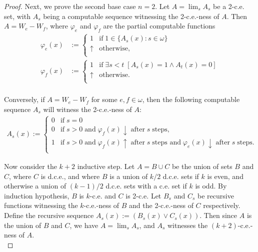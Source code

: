 \documentclass{article}
\begin{document}
\begin{enumerate}[label={\bf Q\arabic*:}]
\begin{proof}
      Next, we prove the second base case $n=2$. Let $A=\lim_s A_s$ be a
      2-c.e. set, with $A_s$ being a computable sequence witnessing the
      2-c.e.-ness of $A$. Then $A=W_e-W_f$, where $\varphi_e$ and
      $\varphi_f$ are the partial computable functions
      \begin{align*}
        \varphi_e(x) &:=
        \begin{cases}
          1 &\text{if}\; 1\in\{A_s(x):s\in\omega\}\\
          \uparrow &\text{otherwise},\\
        \end{cases}\\
        \varphi_f(x) &:=
        \begin{cases}
          1 &\text{if}\; \exists s<t\; \left[A_s(x)=1\wedge
            A_t(x)=0\right]\\
          \uparrow &\text{otherwise}.\\
        \end{cases}\\
      \end{align*}

      Conversely, if $A=W_e-W_f$ for some $e,f\in\omega$, then the
      following computable sequence $A_s$ will witness the 2-c.e.-ness of
      $A$:
      \begin{align*}
        A_s(x) :=
        \begin{cases}
          0 &\text{if}\; s=0\\
          0 &\text{if}\; s>0\; \text{and}\; \varphi_f(x)\downarrow\;
            \text{after}\; s\; \text{steps},\\
          1 &\text{if}\; s>0\; \text{and}\; \varphi_f(x)\uparrow\;
            \text{after}\; s\; \text{steps and}\; \varphi_e(x)\downarrow\;
            \text{after}\; s\; \text{steps}.\\
        \end{cases}
      \end{align*}

      Now consider the $k+2$ inductive step. Let $A=B\cup C$ be the union
      of sets $B$ and $C$, where $C$ is d.c.e., and where $B$ is a union of
      $k/2$ d.c.e. sets if $k$ is even, and otherwise a union of $(k-1)/2$
      d.c.e. sets with a c.e. set if $k$ is odd. By induction hypothesis,
      $B$ is $k$-c.e. and $C$ is 2-c.e. Let $B_s$ and $C_s$ be recursive
      functions witnessing the $k$-c.e.-ness of $B$ and the 2-c.e.-ness of
      $C$ respectively. Define the recursive sequence $A_s(x) :=(B_s(x)\vee
      C_s(x))$. Then since $A$ is the union of $B$ and $C$, we have
      $A=\lim_s A_s$, and $A_s$ witnesses the $(k+2)$-c.e.-ness of $A$. \\


\end{proof}
\end{enumerate}
\end{document}
